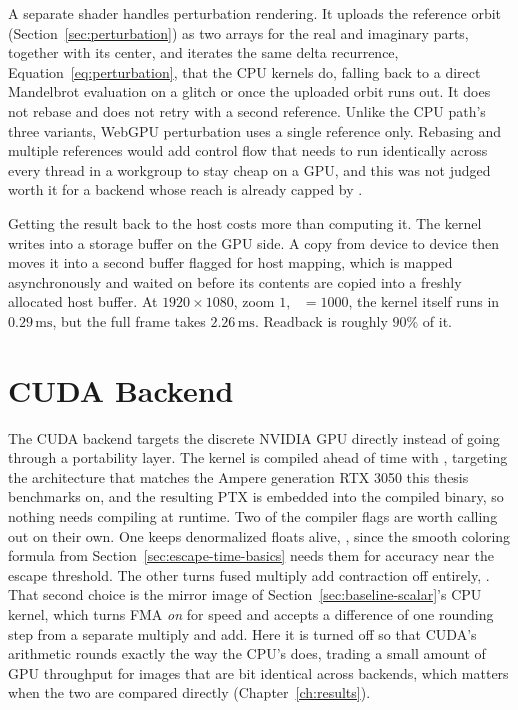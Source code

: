 \documentclass{ftndiplomski}
\begin{document}
A separate shader handles perturbation rendering. It uploads the reference orbit
(Section~\ref{sec:perturbation}) as two  arrays for the real and imaginary parts, together with
its center, and iterates the same delta recurrence, Equation~\ref{eq:perturbation}, that the CPU
kernels do, falling back to a direct  Mandelbrot evaluation on a glitch or once the
uploaded orbit runs out. It does not rebase and does not retry with a second reference. Unlike the
CPU path's three variants, WebGPU perturbation uses a single reference only. Rebasing and
multiple references would add control flow that needs to run identically across every thread in a
workgroup to stay cheap on a GPU, and this was not judged worth it for a backend whose reach is already
capped by .

Getting the result back to the host costs more than computing it. The kernel writes into a
storage buffer on the GPU side. A copy from device to device then moves it into a second buffer flagged for
host mapping, which is mapped asynchronously and waited on before its contents are copied into a
freshly allocated host buffer. At $1920\times1080$, zoom $1$, ~$=1000$, the kernel
itself runs in $0.29\,\mathrm{ms}$, but the full frame takes $2.26\,\mathrm{ms}$. Readback is
roughly $90\%$ of it.

\section{CUDA Backend}
\label{sec:cuda}

The CUDA backend targets the discrete NVIDIA GPU directly instead of going through a portability
layer. The kernel is compiled ahead of time with , targeting the 
architecture that matches the Ampere generation RTX 3050 this thesis benchmarks on, and the
resulting PTX is embedded into the compiled binary, so nothing needs compiling at runtime. Two of the compiler flags are
worth calling out on their own. One keeps denormalized floats alive, , since the
smooth coloring formula from Section~\ref{sec:escape-time-basics} needs them for accuracy near the
escape threshold. The other turns fused multiply add contraction off entirely, .
That second choice is the mirror image of Section~\ref{sec:baseline-scalar}'s
CPU kernel, which turns FMA \emph{on} for speed and accepts a difference of one rounding step from a
separate multiply and add. Here it is turned off so that CUDA's arithmetic rounds exactly the way
the CPU's does, trading a small amount of GPU throughput for images that are bit identical across
backends, which matters when the two are compared directly (Chapter~\ref{ch:results}).
\end{document}
